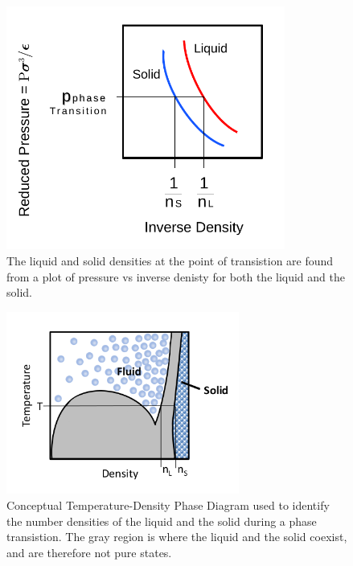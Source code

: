 \documentclass[double,12pt]{beavtex}
\begin{document}
\begin{figure}[h!]
    \centering
    \includegraphics[height=8cm]{figs/MaxwellDTC-Fig3.pdf}
    \caption{The liquid and solid densities at the point of transistion are 
    found from a plot of pressure vs inverse denisty for both the liquid and the solid.}
    \label{fig:Pvsinvn}
  \end{figure}

\begin{figure}[h!]
    \centering
    \includegraphics[height=6cm]{T-n_Diagram.png}
    \caption{Conceptual Temperature-Density Phase Diagram used to identify 
    the number densities of the liquid and the solid during a phase 
    transistion. The gray region is where the liquid and the solid coexist, 
    and are therefore not pure states.}
    \label{fig:T-n_Diagram}
  \end{figure} 
\end{document}
